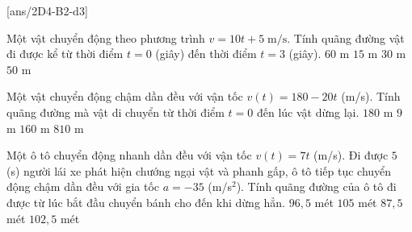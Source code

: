 \setcounter{ex}{0}
[ans/2D4-B2-d3]

\begin{ex}
	Một vật chuyển động theo phương trình $v=10t+5\; \mathrm{m/s}$. Tính quãng đường vật đi được kể từ thời điểm $t=0$ (giây) đến thời điểm $t=3$ (giây).
	\choice
	{\True $60$ m}
	{$15$ m}
	{$30$ m}
	{$50$ m}
\end{ex}

\begin{ex}%
	Một vật chuyển động chậm dần đều với vận tốc $v(t)=180-20t$ (m/s). Tính quãng đường mà vật di chuyển từ thời điểm $t=0$ đến lúc vật dừng lại.
	\choice
	{$ 180 $ m}
	{$ 9$ m}
	{$ 160 $ m}
	{\True $ 810 $ m}
\end{ex}

\begin{ex}%
	Một ô tô chuyển động nhanh dần đều với vận tốc $v(t) = 7t$ (m/s). Đi được $5$ (s) người lái xe phát hiện chướng ngại vật và phanh gấp, ô tô tiếp tục chuyển động chậm dần đều với gia tốc $a = -35$ (m/s$^2$). Tính quãng đường của ô tô đi được từ lúc bắt đầu chuyển bánh cho đến khi dừng hẳn.
	\choice
	{$96{,}5$ mét}
	{\True $105$ mét}
	{$87{,}5$ mét}
	{$102{,}5$ mét}
\end{ex}


